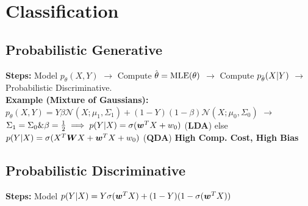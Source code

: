 \section*{Classification}


\subsection*{Probabilistic Generative}
\textbf{Steps:} Model $p_\theta(X,Y)$ $\rightarrow$ Compute $\hat{\kern0pt \theta} = \mathrm{MLE}(\theta)$ $\rightarrow$ Compute $p_{\hat{\kern0pt \theta}}(X|Y)$ $\rightarrow$ Probabilistic Discriminative.\\
\textbf{Example (Mixture of Gaussians):} $p_\theta(X,Y)=Y\beta\mathcal{N}(X;\mu_1,\Sigma_1)+(1-Y)(1-\beta)\mathcal{N}(X;\mu_0,\Sigma_0)$ $\rightarrow$ $\Sigma_1=\Sigma_0 \& \beta=\frac{1}{2} \implies p(Y|X) = \sigma({\bm{w}}^TX + w_0)$ (\textbf{LDA}) else $p(Y|X) = \sigma(X^T{\bm{W}} X + {\bm{w}}^TX + w_0)$ (\textbf{QDA})
\textbf{{\color{red} High Comp. Cost}, {\color{red}High Bias}}
\subsection*{Probabilistic Discriminative}
\textbf{Steps:} Model $p(Y|X) = Y\sigma({\bm{w}}^TX)+(1-Y)(1-\sigma({\bm{w}}^TX))$

